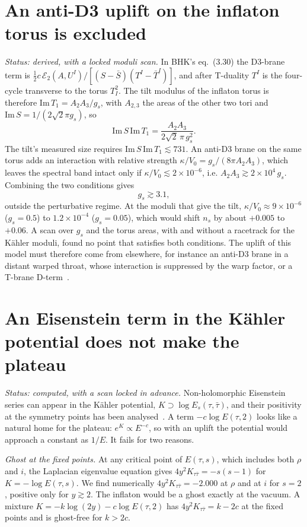 \documentclass[aps,prd,twocolumn,superscriptaddress,nofootinbib,showkeys]{revtex4-2}
\begin{document}
\section{An anti-D3 uplift on the inflaton torus is excluded}
\emph{Status: derived, with a locked moduli scan.}
In BHK's eq.~(3.30) the D3-brane term is $\tfrac12 c\,\mathcal{E}_2(A,U^I)/[(S-\bar S)(T^I-\bar T^I)]$, and after T-duality $T^I$ is the four-cycle transverse to the torus $T^2_I$. The tilt modulus of the inflaton torus is therefore $\mathrm{Im}\,T_1=A_2A_3/g_s$, with $A_{2,3}$ the areas of the other two tori and $\mathrm{Im}\,S=1/(2\sqrt2\pi g_s)$, so
\begin{equation}
\mathrm{Im}\,S\,\mathrm{Im}\,T_1=\frac{A_2A_3}{2\sqrt2\,\pi\,g_s^2}.
\end{equation}
The tilt's measured size requires $\mathrm{Im}\,S\,\mathrm{Im}\,T_1\lesssim731$. An anti-D3 brane on the same torus adds an interaction with relative strength $\kappa/V_0=g_s/(8\pi A_2A_3)$, which leaves the spectral band intact only if $\kappa/V_0\lesssim2\times10^{-6}$, i.e. $A_2A_3\gtrsim2\times10^4\,g_s$. Combining the two conditions gives
\begin{equation}
g_s\gtrsim3.1,
\end{equation}
outside the perturbative regime. At the moduli that give the tilt, $\kappa/V_0\approx9\times10^{-6}$ ($g_s=0.5$) to $1.2\times10^{-4}$ ($g_s=0.05$), which would shift $n_s$ by about $+0.005$ to $+0.06$. A scan over $g_s$ and the torus areas, with and without a racetrack for the K\"ahler moduli, found no point that satisfies both conditions. The uplift of this model must therefore come from elsewhere, for instance an anti-D3 brane in a distant warped throat, whose interaction is suppressed by the warp factor, or a T-brane D-term~\cite{TBRANE}.

\section{An Eisenstein term in the K\"ahler potential does not make the plateau}
\emph{Status: computed, with a scan locked in advance.}
Non-holomorphic Eisenstein series can appear in the K\"ahler potential, $K\supset\log E_s(\tau,\bar\tau)$, and their positivity at the symmetry points has been analysed~\cite{MV}. A term $-c\log E(\tau,2)$ looks like a natural home for the plateau: $e^K\propto E^{-c}$, so with an uplift the potential would approach a constant as $1/E$. It fails for two reasons.

\emph{Ghost at the fixed points.} At any critical point of $E(\tau,s)$, which includes both $\rho$ and $i$, the Laplacian eigenvalue equation gives $4y^2K_{\tau\bar\tau}=-s(s-1)$ for $K=-\log E(\tau,s)$. We find numerically $4y^2K_{\tau\bar\tau}=-2.000$ at $\rho$ and at $i$ for $s=2$, positive only for $y\gtrsim2$. The inflaton would be a ghost exactly at the vacuum. A mixture $K=-k\log(2y)-c\log E(\tau,2)$ has $4y^2K_{\tau\bar\tau}=k-2c$ at the fixed points and is ghost-free for $k>2c$.
\end{document}
